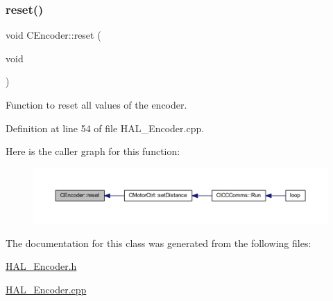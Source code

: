 \subsubsection{\texorpdfstring{reset()}{reset()}}
{\footnotesize\ttfamily void C\+Encoder\+::reset (\begin{DoxyParamCaption}\item[{void}]{ }\end{DoxyParamCaption})}



Function to reset all values of the encoder. 



Definition at line 54 of file H\+A\+L\+\_\+\+Encoder.\+cpp.

Here is the caller graph for this function\+:
\nopagebreak
\begin{figure}[H]
\begin{center}
\leavevmode
\includegraphics[width=350pt]{class_c_encoder_ab71d6281e3f4d9f875f45368a3434980_icgraph}
\end{center}
\end{figure}


The documentation for this class was generated from the following files\+:\begin{DoxyCompactItemize}
\item 
\mbox{\hyperlink{_h_a_l___encoder_8h}{H\+A\+L\+\_\+\+Encoder.\+h}}\item 
\mbox{\hyperlink{_h_a_l___encoder_8cpp}{H\+A\+L\+\_\+\+Encoder.\+cpp}}\end{DoxyCompactItemize}

